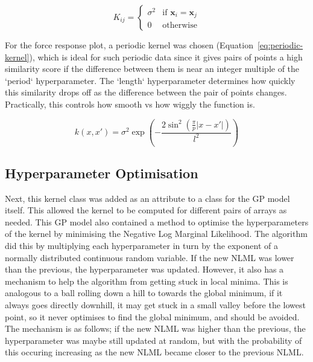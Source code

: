 \documentclass[12pt]{article}
\begin{document}
    \begin{equation}
        K_{ij} =
        \begin{cases}
            \sigma^2 & \text{if } \mathbf{x}_i = \mathbf{x}_j \\
            0 & \text{otherwise}
        \end{cases}\label{eq:white-noise-kernel}
    \end{equation}

    For the force response plot, a periodic kernel was chosen (Equation~\ref{eq:periodic-kernel}), which is ideal for such periodic data since it gives pairs of points a high similarity score if the difference between them is near an integer multiple of the `period` hyperparameter.
    The `length` hyperparameter determines how quickly this similarity drops off as the difference between the pair of points changes.
    Practically, this controls how smooth vs how wiggly the function is.

    \begin{equation}
        k(x, x') = \sigma^2 \exp\left(- \frac{2 \sin^2\left(\frac{\pi}{p} |x - x'|\right)}{l^2}\right)\label{eq:periodic-kernel}
    \end{equation}

    \subsection{Hyperparameter Optimisation}
    Next, this kernel class was added as an attribute to a class for the GP model itself.
    This allowed the kernel to be computed for different pairs of arrays as needed.
    This GP model also contained a method to optimise the hyperparameters of the kernel by minimising the Negative Log Marginal Likelihood.
    The algorithm did this by multiplying each hyperparameter in turn by the exponent of a normally distributed continuous random variable.
    If the new NLML was lower than the previous, the hyperparameter was updated.
    However, it also has a mechanism to help the algorithm from getting stuck in local minima.
    This is analogous to a ball rolling down a hill to towards the global minimum, if it always goes directly downhill, it may get stuck in a small valley before the lowest point, so it never optimises to find the global minimum, and should be avoided.
    The mechanism is as follows; if the new NLML was higher than the previous, the hyperparameter was maybe still updated at random, but with the probability of this occuring increasing as the new NLML became closer to the previous NLML\@.
\end{document}
